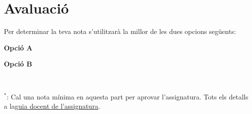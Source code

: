 \section*{Avaluació}
Per determinar la teva nota s'utilitzarà la millor de les dues opcions següents:\\
\noindent\begin{minipage}{0.48\linewidth}
\raggedright
\textbf{Opció A}\\[0.15cm]
\end{minipage}%
\hfill
\begin{minipage}{0.36\linewidth} %
\raggedleft
\textbf{Opció B}\\[0.15cm]
\end{minipage}
\\[0.1cm]
\begin{center}
{\footnotesize $^{*}$: Cal una nota mínima en aquesta part per aprovar l'assignatura. Tots els detalls a la\pdfbreak \href{https://apps.uab.cat/guies/public/html/2026/assignatura/104353/ca}{\underline{guia docent de l'assignatura}}.}\\[0.1cm]
\end{center}
